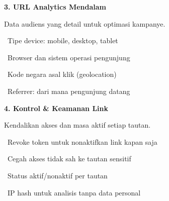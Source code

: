 \documentclass[a4paper]{article}
\begin{document}
\noindent
\begin{minipage}[t]{0.485\textwidth}
    \colorbox{EmeraldPrimary}{%
        \begin{minipage}{\dimexpr\textwidth-2\fboxsep\relax}
            {\fontsize{10}{13}\selectfont\bfseries\color{White} 3. URL Analytics Mendalam}
        \end{minipage}}\par
    \vspace{4pt}
    {\fontsize{9}{12}\selectfont\color{TextDark}%
    Data audiens yang detail untuk optimasi kampanye.\par\vspace{3pt}
    \textbullet\ Tipe device: mobile, desktop, tablet\par\vspace{2pt}%
    \textbullet\ Browser dan sistem operasi pengunjung\par\vspace{2pt}%
    \textbullet\ Kode negara asal klik (geolocation)\par\vspace{2pt}%
    \textbullet\ Referrer: dari mana pengunjung datang}%
\end{minipage}%
\hfill
\begin{minipage}[t]{0.485\textwidth}
    \colorbox{PurplePrimary}{%
        \begin{minipage}{\dimexpr\textwidth-2\fboxsep\relax}
            {\fontsize{10}{13}\selectfont\bfseries\color{White} 4. Kontrol \& Keamanan Link}
        \end{minipage}}\par
    \vspace{4pt}
    {\fontsize{9}{12}\selectfont\color{TextDark}%
    Kendalikan akses dan masa aktif setiap tautan.\par\vspace{3pt}
    \textbullet\ Revoke token untuk nonaktifkan link kapan saja\par\vspace{2pt}%
    \textbullet\ Cegah akses tidak sah ke tautan sensitif\par\vspace{2pt}%
    \textbullet\ Status aktif/nonaktif per tautan\par\vspace{2pt}%
    \textbullet\ IP hash untuk analisis tanpa data personal}%
\end{minipage}

\vspace{8pt}
\end{document}
